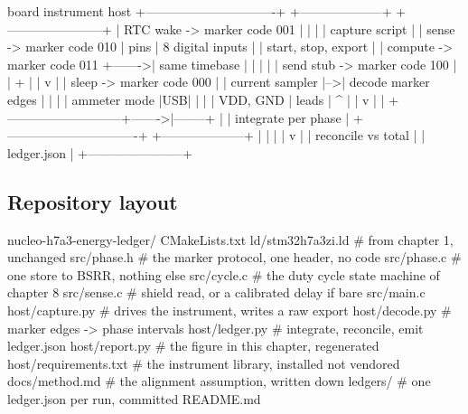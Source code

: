 \begin{asciiart}
  board                                    instrument                      host
  +-------------------------------+        +--------------------+   +-----------------------+
  | RTC wake  -> marker code 001  |        |                    |   | capture script        |
  | sense     -> marker code 010  | pins   | 8 digital inputs   |   |   start, stop, export |
  | compute   -> marker code 011  +------->|   same timebase    |   |        |              |
  | send stub -> marker code 100  |        |        +           |   |        v              |
  | sleep     -> marker code 000  |        | current sampler    |-->| decode marker edges   |
  |                               |        |   ammeter mode     |USB|        |              |
  | VDD, GND                      | leads  |        ^           |   |        v              |
  |   +---------------------------+------->|--------+           |   | integrate per phase   |
  +-------------------------------+        +--------------------+   |        |              |
                                                                    |        v              |
                                                                    | reconcile vs total    |
                                                                    | ledger.json           |
                                                                    +-----------------------+
\end{asciiart}

\subsection*{Repository layout}

\begin{plaincode}
nucleo-h7a3-energy-ledger/
  CMakeLists.txt
  ld/stm32h7a3zi.ld              # from chapter 1, unchanged
  src/phase.h                    # the marker protocol, one header, no code
  src/phase.c                    # one store to BSRR, nothing else
  src/cycle.c                    # the duty cycle state machine of chapter 8
  src/sense.c                    # shield read, or a calibrated delay if bare
  src/main.c
  host/capture.py                # drives the instrument, writes a raw export
  host/decode.py                 # marker edges -> phase intervals
  host/ledger.py                 # integrate, reconcile, emit ledger.json
  host/report.py                 # the figure in this chapter, regenerated
  host/requirements.txt          # the instrument library, installed not vendored
  docs/method.md                 # the alignment assumption, written down
  ledgers/                       # one ledger.json per run, committed
  README.md
\end{plaincode}


